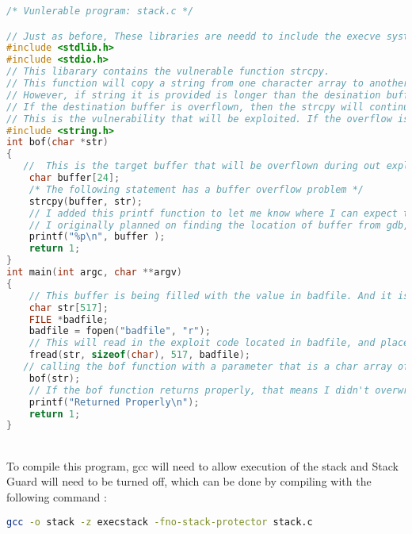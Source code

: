 \documentclass[14pt]{extarticle}
\begin{document}
\begin{lstlisting}[language=c]
/* Vunlerable program: stack.c */

// Just as before, These libraries are needd to include the execve system function
#include <stdlib.h>
#include <stdio.h>
// This libarary contains the vulnerable function strcpy. 
// This function will copy a string from one character array to another, and it will only stop when it sees a null value. 
// However, if string it is provided is longer than the desination buffer with no null values to end it, then the strcpy function will continue copying values from the source buffer into the destination, even if it overflows the destination buffer.
// If the destination buffer is overflown, then the strcpy will continue writing the source values directly onto the stack. 
// This is the vulnerability that will be exploited. If the overflow is long enough, it will be possible to change the return address of the function. And if we place our own assembly code in the stack, I can set the return address to return to the exploit code.  
#include <string.h>
int bof(char *str)
{
   //  This is the target buffer that will be overflown during out exploit
    char buffer[24];
    /* The following statement has a buffer overflow problem */
    strcpy(buffer, str);
    // I added this printf function to let me know where I can expect to find the start of the stack.
    // I originally planned on finding the location of buffer from gdb, but gdb adds in it's own acm 
    printf("%p\n", buffer );
    return 1;
}
int main(int argc, char **argv)
{
    // This buffer is being filled with the value in badfile. And it is much larger than the buffer in bof.
    char str[517];
    FILE *badfile;
    badfile = fopen("badfile", "r");
    // This will read in the exploit code located in badfile, and place it  in the str variable. later this code will be placed on the stack in the bof function.
    fread(str, sizeof(char), 517, badfile);
   // calling the bof function with a parameter that is a char array of 517 bytes ( much larger than the 24 byte buffer in bof)
    bof(str);
    // If the bof function returns properly, that means I didn't overwrite the return address correctly. This will let me know that it returned to the main function.
    printf("Returned Properly\n");
    return 1;
}
\end{lstlisting}\cite{seed-bof}\\

To compile this program, gcc will need to allow execution of the stack and Stack Guard will need to be turned off, which can be done by compiling with the following command \cite{seed-bof}:
\begin{lstlisting}[language=bash]
    gcc -o stack -z execstack -fno-stack-protector stack.c
\end{lstlisting}
\end{document}
